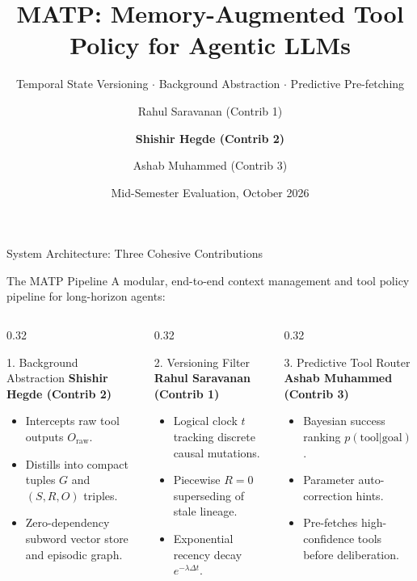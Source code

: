 \documentclass[aspectratio=169,10pt]{beamer}
\title[MATP Midsem]{MATP: Memory-Augmented Tool Policy for Agentic LLMs}
\subtitle{Temporal State Versioning $\cdot$ Background Abstraction $\cdot$ Predictive Pre-fetching}
\author[MATP Team]{Rahul Saravanan (Contrib 1) \and \textbf{Shishir Hegde (Contrib 2)} \and Ashab Muhammed (Contrib 3)}
\institute[NITK]{Department of Information Technology \\ National Institute of Technology Karnataka, Surathkal}
\date{Mid-Semester Evaluation, October 2026}
\begin{document}
\begin{frame}
  \titlepage
\end{frame}

\begin{frame}{System Architecture: Three Cohesive Contributions}
  \begin{block}{The MATP Pipeline}
    A modular, end-to-end context management and tool policy pipeline for long-horizon agents:
  \end{block}
  \vspace{0.3em}
  \begin{columns}[T,onlytextwidth]
    \begin{column}{0.32\textwidth}
      \begin{block}{\small 1. Background Abstraction}
        {\footnotesize \textbf{Shishir Hegde (Contrib 2)}}
        \begin{itemize}
          \scriptsize
          \item Intercepts raw tool outputs $O_{\mathrm{raw}}$.
          \item Distills into compact tuples $G$ and $(S,R,O)$ triples.
          \item Zero-dependency subword vector store and episodic graph.
        \end{itemize}
      \end{block}
    \end{column}
    \begin{column}{0.32\textwidth}
      \begin{block}{\small 2. Versioning Filter}
        {\footnotesize \textbf{Rahul Saravanan (Contrib 1)}}
        \begin{itemize}
          \scriptsize
          \item Logical clock $t$ tracking discrete causal mutations.
          \item Piecewise $R=0$ superseding of stale lineage.
          \item Exponential recency decay $e^{-\lambda \Delta t}$.
        \end{itemize}
      \end{block}
    \end{column}
    \begin{column}{0.32\textwidth}
      \begin{block}{\small 3. Predictive Tool Router}
        {\footnotesize \textbf{Ashab Muhammed (Contrib 3)}}
        \begin{itemize}
          \scriptsize
          \item Bayesian success ranking $p(\mathrm{tool}|\mathrm{goal})$.
          \item Parameter auto-correction hints.
          \item Pre-fetches high-confidence tools before deliberation.
        \end{itemize}
      \end{block}
    \end{column}
  \end{columns}
\end{frame}
\end{document}

